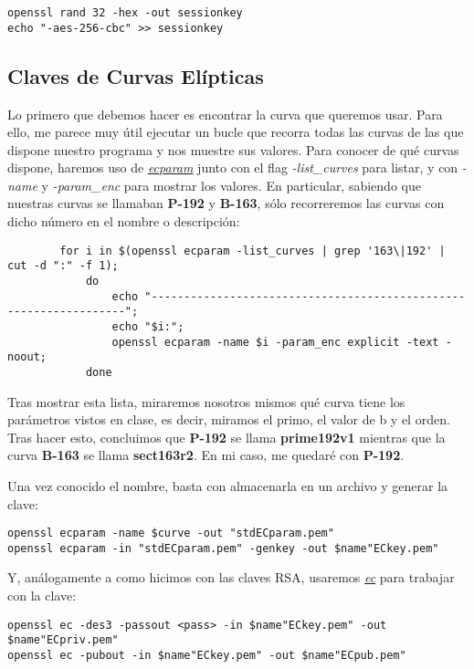 \documentclass[a4paper, 11pt]{article}
\begin{document}
		\begin{small}
			\verb|openssl rand 32 -hex -out sessionkey| \\
			\verb|echo "-aes-256-cbc" >> sessionkey|
		\end{small}
		
	\subsection{Claves de Curvas Elípticas}
		Lo primero que debemos hacer es encontrar la curva que queremos usar. Para ello, me parece muy útil ejecutar un
		bucle que recorra todas las curvas de las que dispone nuestro programa y nos muestre sus valores. Para conocer
		de qué curvas dispone, haremos uso de \href{https://www.openssl.org/docs/man1.0.2/apps/ecparam.html}
		{\textit{ecparam}} junto con el flag \textit{-list\_curves} para listar, y con \textit{-name} y \textit{-param\_enc}
		para mostrar los valores. En particular, sabiendo que nuestras curvas se llamaban \textbf{P-192} y \textbf{B-163},
		sólo recorreremos las curvas con dicho número en el nombre o descripción:
		\begin{verbatim}
		for i in $(openssl ecparam -list_curves | grep '163\|192' | cut -d ":" -f 1);
			do
				echo "------------------------------------------------------------------";
				echo "$i:";
				openssl ecparam -name $i -param_enc explicit -text -noout;
			done
		\end{verbatim}
		
		Tras mostrar esta lista, miraremos nosotros mismos qué curva tiene los parámetros vistos en clase, es decir,
		miramos el primo, el valor de b y el orden. Tras hacer esto, concluimos que \textbf{P-192} se llama
		\textbf{prime192v1} mientras que la curva \textbf{B-163} se llama \textbf{sect163r2}. En mi caso, me quedaré
		con \textbf{P-192}.
		
		Una vez conocido el nombre, basta con almacenarla en un archivo y generar la clave: \\		
		\begin{small}
			\verb|openssl ecparam -name $curve -out "stdECparam.pem"| \\
			\verb|openssl ecparam -in "stdECparam.pem" -genkey -out $name"ECkey.pem"|
		\end{small}
		
		Y, análogamente a como hicimos con las claves RSA, usaremos \href{https://www.openssl.org/docs/man1.0.2/apps/ec.html}
		{\textit{ec}} para trabajar con la clave: \\
		\begin{small}
			\verb|openssl ec -des3 -passout <pass> -in $name"ECkey.pem" -out $name"ECpriv.pem"| \\
			\verb|openssl ec -pubout -in $name"ECkey.pem" -out $name"ECpub.pem"|
		\end{small}
	
\end{document}
